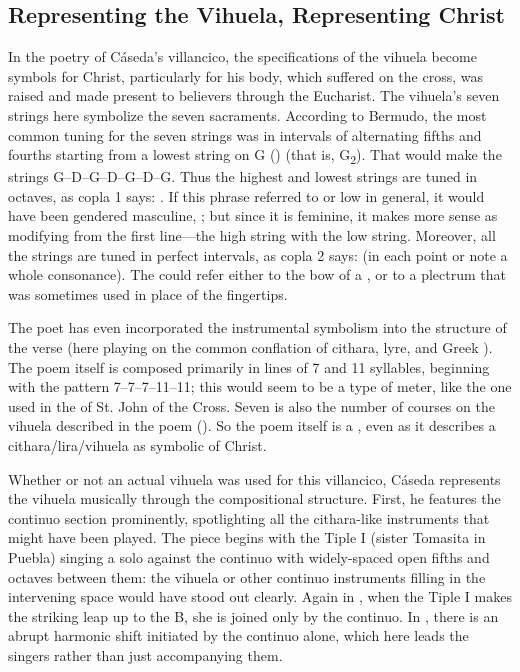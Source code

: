 
\subsection{Representing the Vihuela, Representing Christ}

In the poetry of Cáseda's villancico, the specifications of the vihuela become symbols for Christ, particularly for his body, which suffered on the cross, was raised and made present to believers through the Eucharist.
The vihuela's seven strings here symbolize the seven sacraments.
According to Bermudo, the most common tuning for the seven strings was in intervals of alternating fifths and fourths starting from a lowest string on G () (that is, G\textsubscript{2}).%
	\autocite[109r--109v]{Bermudo:Declaracion}
That would make the strings G--D--G--D--G--D--G.
Thus the highest and lowest strings are tuned in octaves, as copla 1 says: .
If this phrase referred to  or low in general, it would have been gendered masculine, ; but since it is feminine, it makes more sense as modifying  from the first line---the high string with the low string.
Moreover, all the strings are tuned in perfect intervals, as copla 2 says:  (in each point or note a whole consonance).
The  could refer either to the bow of a , or to a plectrum that was sometimes used in place of the fingertips.

The poet has even incorporated the instrumental symbolism into the structure of the verse (here playing on the common conflation of cithara, lyre, and Greek ).
The poem itself is composed primarily in lines of 7 and 11 syllables, beginning with the pattern 7--7--7--11--11; this would seem to be a type of  meter, like the one used in the  of St. John of the Cross.
Seven is also the number of courses on the vihuela described in the poem ().
So the poem itself is a , even as it describes a cithara/lira/vihuela as symbolic of Christ.

Whether or not an actual vihuela was used for this villancico, Cáseda represents the vihuela musically through the compositional structure.
First, he features the continuo section prominently, spotlighting all the cithara-like instruments that might have been played.
The piece begins with the Tiple I (sister Tomasita in Puebla) singing a solo against the continuo with widely-spaced open fifths and octaves between them: the vihuela or other continuo instruments filling in the intervening space would have stood out clearly.
Again in , when the Tiple I makes the striking leap up to the B\fl{}, she is joined only by the continuo.
In , there is an abrupt harmonic shift initiated by the continuo alone, which here leads the singers rather than just accompanying them.

